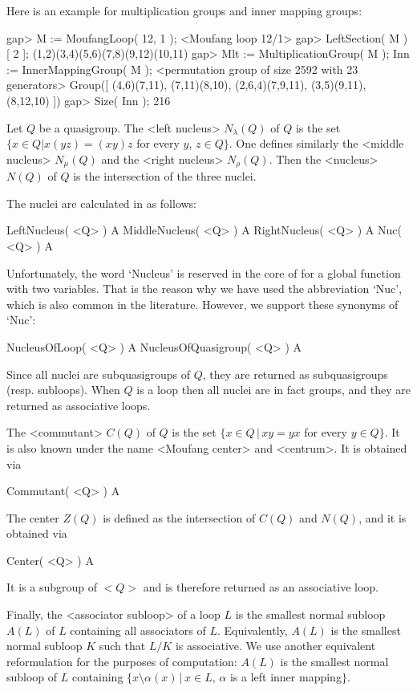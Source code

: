 Here is an example for multiplication groups and inner mapping groups:

\beginexample
gap> M := MoufangLoop( 12, 1 );
<Moufang loop 12/1>
gap> LeftSection( M )[ 2 ];
(1,2)(3,4)(5,6)(7,8)(9,12)(10,11)
gap> Mlt := MultiplicationGroup( M ); Inn := InnerMappingGroup( M );
<permutation group of size 2592 with 23 generators>
Group([ (4,6)(7,11), (7,11)(8,10), (2,6,4)(7,9,11), (3,5)(9,11), (8,12,10) ])
gap> Size( Inn );
216
\endexample


Let $Q$ be a quasigroup. The <left nucleus> $N_\lambda(Q)$
of $Q$ is the set $\{x\in Q| x(yz)=(xy)z$ for every $y$, $z\in Q\}$. One
defines similarly the <middle nucleus> $N_\mu(Q)$ and the
<right nucleus> $N_\rho(Q)$. Then the
<nucleus> $N(Q)$ of $Q$ is the intersection of the three nuclei.

The nuclei are calculated in {\LOOPS} as follows:

\>LeftNucleus( <Q> ) A
\>MiddleNucleus( <Q> ) A
\>RightNucleus( <Q> ) A
\>Nuc( <Q> ) A

Unfortunately, the word `Nucleus' is reserved in the core of {\GAP} for a
global function with two variables. That is the reason why we have used the
abbreviation `Nuc', which is also common in the literature. However, we support
these synonyms of `Nuc':

\>NucleusOfLoop( <Q> ) A
\>NucleusOfQuasigroup( <Q> ) A

Since all nuclei are subquasigroups of $Q$, they are returned as subquasigroups
(resp. subloops). When $Q$ is a loop then all nuclei are in fact groups, and
they are returned as associative loops.

The <commutant> $C(Q)$ of $Q$ is the set $\{x\in Q\,|\,xy=yx$
for every $y\in Q\}$. It is also known under the name <Moufang
center> and <centrum>. It is obtained via

\>Commutant( <Q> ) A

The center $Z(Q)$ is defined as the intersection of $C(Q)$ and $N(Q)$, and it
is obtained via

\>Center( <Q> ) A

It is a subgroup of $<Q>$ and is therefore returned as an associative loop.

Finally, the <associator subloop> of a loop $L$ is
the smallest normal subloop $A(L)$ of $L$ containing all associators of $L$.
Equivalently, $A(L)$ is the smallest normal subloop $K$ such that $L/K$ is
associative. We use another equivalent reformulation for the purposes of
computation: $A(L)$ is the smallest normal subloop of $L$ containing
$\{x\setminus\alpha(x)\,|\,x\in L,\,\alpha$ is a left inner mapping$\}$.

